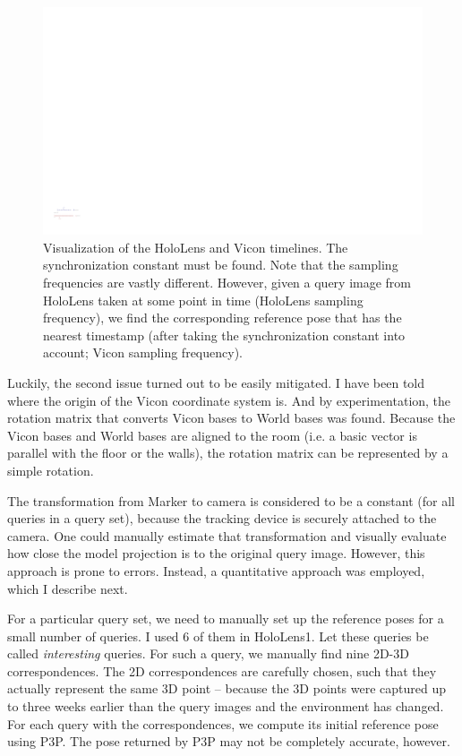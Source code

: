 \documentclass[twoside]{ctuthesis}
\theoremstyle{plain}
\theoremstyle{definition}
\theoremstyle{note}
\begin{document}
\begin{figure}
	\centering
 	\includegraphics[width=1.0\textwidth]{HL_and_vicon_time}
 	\caption[HoloLens and Vicon timelines]{Visualization of the HoloLens and Vicon timelines. The synchronization constant must be found. Note that the sampling frequencies are vastly different. However, given a query image from HoloLens taken at some point in time (HoloLens sampling frequency), we find the corresponding reference pose that has the nearest timestamp (after taking the synchronization constant into account; Vicon sampling frequency).}
 	\label{fig:HL_and_vicon_time}
\end{figure} 

Luckily, the second issue turned out to be easily mitigated. I have been told where the origin of the Vicon coordinate system is. And by experimentation, the rotation matrix that converts Vicon bases to World bases was found. Because the Vicon bases and World bases are aligned to the room (i.e. a basic vector is parallel with the floor or the walls), the rotation matrix can be represented by a simple rotation.

The transformation from Marker to camera is considered to be a constant (for all queries in a query set), because the tracking device is securely attached to the camera. One could manually estimate that transformation and visually evaluate how close the model projection is to the original query image. However, this approach is prone to errors. Instead, a quantitative approach was employed, which I describe next.

For a particular query set, we need to manually set up the reference poses for a small number of queries. I used 6 of them in HoloLens1. Let these queries be called \emph{interesting} queries. For such a query, we manually find nine 2D-3D correspondences. The 2D correspondences are carefully chosen, such that they actually represent the same 3D point -- because the 3D points were captured up to three weeks earlier than the query images and the environment has changed. For each query with the correspondences, we compute its initial reference pose using P3P. The pose returned by P3P may not be completely accurate, however.
\end{document}
